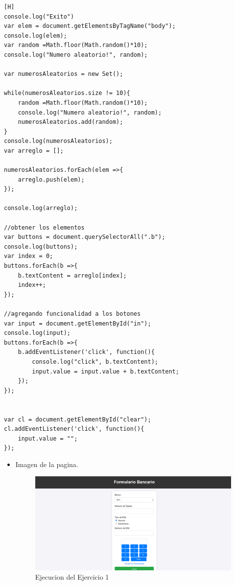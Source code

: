 \documentclass{article}
\begin{document}
	\begin{lstlisting}[language=html,caption={Ejercicio1/scriptejercicio01.js}][H]
console.log("Exito")
var elem = document.getElementsByTagName("body");
console.log(elem);
var random =Math.floor(Math.random()*10);
console.log("Numero aleatorio!", random);

var numerosAleatorios = new Set();

while(numerosAleatorios.size != 10){
    random =Math.floor(Math.random()*10);
    console.log("Numero aleatorio!", random);
    numerosAleatorios.add(random);
}
console.log(numerosAleatorios);
var arreglo = [];

numerosAleatorios.forEach(elem =>{
    arreglo.push(elem);
});

console.log(arreglo);

//obtener los elementos 
var buttons = document.querySelectorAll(".b");
console.log(buttons);
var index = 0;
buttons.forEach(b =>{
    b.textContent = arreglo[index];
    index++;
});

//agregando funcionalidad a los botones
var input = document.getElementById("in");
console.log(input);
buttons.forEach(b =>{
    b.addEventListener('click', function(){
        console.log("click", b.textContent);
        input.value = input.value + b.textContent;
    });
});


var cl = document.getElementById("clear");
cl.addEventListener('click', function(){
    input.value = "";
});
	\end{lstlisting}
	\begin{itemize}	
		\item Imagen de la pagina.
		
		
		
		\begin{figure}[H]
            \centering
            \includegraphics[width=\textwidth]{img/pag1}
            \caption{Ejecucion del Ejercicio 1}
            \label{fig:pagina}
        \end{figure}
	\end{itemize}
	
\end{document}
